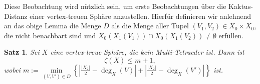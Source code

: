 \documentclass[12pt,titlepage,twoside,cleardoublepage]{article}
\theoremstyle{nummermitklammern}
\newtheorem{satz}[temp]{Satz}
\newtheorem{satz}[zahl]{Satz}
\numberwithin{equation}{section}
\begin{document}

Diese Beobachtung wird nützlich sein, um erste Beobachtungen über die Kaktus-Distanz einer vertex-treuen Sphäre anzustellen. Hierfür definieren wir anlehnend an das obige Lemma die Menge $D$ als die Menge aller Tupel $(V_1,V_2)\in X_0 \times X_0$, die nicht benachbart sind und $ X_0(X_1(V_1))\cap X_0(X_1(V_2))\neq \emptyset$ erfüllen.
\begin{satz}
Sei $X$ eine vertex-treue Sphäre, die kein Multi-Tetraeder ist. Dann ist 
\[
\zeta(X)\leq m+1,
\] wobei $m:=\underset{{(V,V')\in D}}{\min}\left\{\left|\frac{\vert X_2 \vert}{2}-\deg_X(V)\right| +\left| \frac{\vert X_2 \vert}{2}-\deg_X(V')\right|\right\}$
 ist.
\end{satz}
\end{document}
